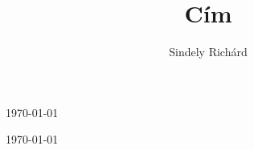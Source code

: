 \documentclass[]{article}
\begin{document}
\title{Cím}
\author{Sindely Richárd}
\maketitle
{}
\frenchspacing
\noindent\setlength{\parskip}{12pt}\hulipsum[1]
\today
\begin{flushright}
{\foreignlanguage{latin}{\lipsum[1]}}
\end{flushright}
{
\linespread{1.6}\selectfont\blindtext[1]
\today
}
\end{document}
